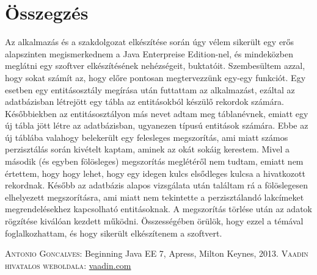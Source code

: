 \documentclass[centeredchapter]{thesis-ekf}
\theoremstyle{definition}
\theoremstyle{remark}
\begin{document}
\hypertarget{figure-datasource-beallitas}{}



\chapter{Összegzés}

Az alkalmazás és a szakdolgozat elkészítése során úgy vélem sikerült egy erős alapszinten megismerkednem a Java Enterpreise Edition-nel, és mindeközben meglátni egy szoftver elkészítésének nehézségeit, buktatóit. Szembesültem azzal, hogy sokat számít az, hogy előre pontosan megtervezzünk egy-egy funkciót. Egy esetben egy entitásosztály megírása után futtattam az alkalmazást, ezáltal az adatbázisban létrejött egy tábla az entitásokból készülő rekordok számára. Későbbiekben az entitásosztályon más nevet adtam meg táblanévnek, emiatt egy új tábla jött létre az adatbázisban, ugyanezen típusú entitások számára. Ebbe az új táblába valahogy belekerült egy felesleges megszorítás, ami miatt számos perzisztálás során kivételt kaptam, aminek az okát sokáig kerestem. Mivel a második (és egyben fölösleges) megszorítás meglétéről nem tudtam, emiatt nem értettem, hogy hogy lehet, hogy egy idegen kulcs elsődleges kulcsa a hivatkozott rekordnak. Később az adatbázis alapos vizsgálata után találtam rá a fölöslegesen elhelyezett megszorításra, ami miatt nem tekintette a perzisztálandó lakcímeket megrendelésekhez kapcsolható entitásoknak. A megszorítás törlése után az adatok rögzítése kiválóan kezdett működni.
Összességében örülök, hogy ezzel a témával foglalkozhattam, és hogy sikerült elkészítenem a szoftvert.


\begin{thebibliography}{1}
 \textsc{Antonio Goncalves}: Beginning Java EE 7, Apress, Milton Keynes, 2013.
 \textsc{Vaadin hivatalos weboldala}: \href{https://vaadin.com/docs/-/part/framework/components/components-overview.html}{vaadin.com}
\end{thebibliography}
\end{document}
